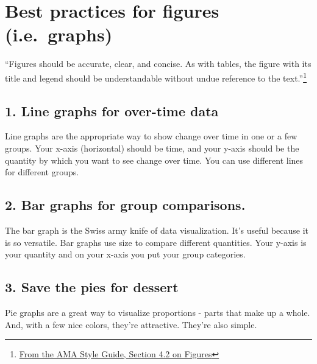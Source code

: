 \documentclass[
  letterpaper,
  DIV=11,
  numbers=noendperiod]{scrreprt}
\begin{document}
\hypertarget{best-practices-for-figures-i.e.-graphs}{%
\section*{Best practices for figures
(i.e.~graphs)}\label{best-practices-for-figures-i.e.-graphs}}

``Figures should be accurate, clear, and concise. As with tables, the
figure with its title and legend should be understandable without undue
reference to the text.''\footnote{\href{https://academic.oup.com/amamanualofstyle/book/27941/chapter/207563838}{From
  the AMA Style Guide, Section 4.2 on Figures}}

\hypertarget{line-graphs-for-over-time-data}{%
\subsection*{1. Line graphs for over-time
data}\label{line-graphs-for-over-time-data}}

Line graphs are the appropriate way to show change over time in one or a
few groups. Your x-axis (horizontal) should be time, and your y-axis
should be the quantity by which you want to see change over time. You
can use different lines for different groups.

\hypertarget{bar-graphs-for-group-comparisons.}{%
\subsection*{2. Bar graphs for group
comparisons.}\label{bar-graphs-for-group-comparisons.}}

The bar graph is the Swiss army knife of data visualization. It's useful
because it is so versatile. Bar graphs use size to compare different
quantities. Your y-axis is your quantity and on your x-axis you put your
group categories.

\hypertarget{save-the-pies-for-dessert}{%
\subsection*{3. Save the pies for
dessert}\label{save-the-pies-for-dessert}}

Pie graphs are a great way to visualize proportions - parts that make up
a whole. And, with a few nice colors, they're attractive. They're also
simple.
\end{document}
